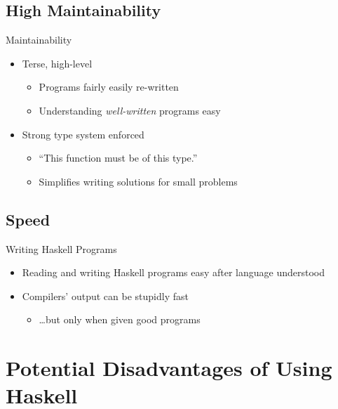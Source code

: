 \documentclass{beamer}
\begin{document}
		\subsection{High Maintainability}
			\begin{frame}{Maintainability}
				\begin{itemize}
					\item Terse, high-level
					\begin{itemize}
						\item Programs fairly easily re-written
						\item Understanding \textit{well-written} programs easy
					\end{itemize}
					\item Strong type system enforced
					\begin{itemize}
						\item ``This function must be of this type.''
						\item Simplifies writing solutions for small problems
					\end{itemize}
				\end{itemize}
			\end{frame}
		\subsection{Speed}
			\begin{frame}{Writing Haskell Programs}
				\begin{itemize}
					\item Reading and writing Haskell programs easy after language
						understood
					\item Compilers' output can be stupidly fast
					\begin{itemize}
						\item \dots but only when given good programs
					\end{itemize}
				\end{itemize}
			\end{frame}
	\section{Potential Disadvantages of Using Haskell}
\end{document}

